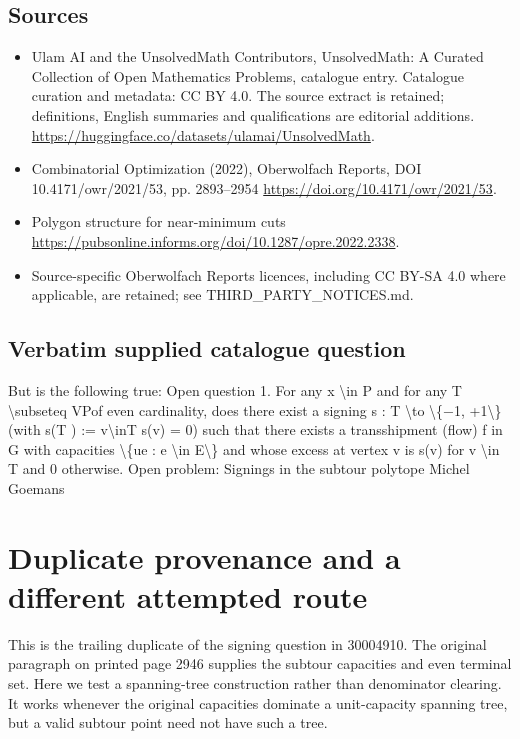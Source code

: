 \documentclass[11pt]{article}
\begin{document}
\subsection{Sources}
\begin{itemize}
\item[S1] Ulam AI and the UnsolvedMath Contributors, UnsolvedMath: A Curated Collection of Open Mathematics Problems, catalogue entry. Catalogue curation and metadata: CC BY 4.0. The source extract is retained; definitions, English summaries and qualifications are editorial additions.
\url{https://huggingface.co/datasets/ulamai/UnsolvedMath}.
\item[S2] Combinatorial Optimization (2022), Oberwolfach Reports, DOI 10.4171/owr/2021/53, pp. 2893--2954
\url{https://doi.org/10.4171/owr/2021/53}.
\item[S3] Polygon structure for near-minimum cuts
\url{https://pubsonline.informs.org/doi/10.1287/opre.2022.2338}.
\item Source-specific Oberwolfach Reports licences, including CC BY-SA 4.0 where applicable, are retained; see THIRD\_PARTY\_NOTICES.md.
\end{itemize}
\subsection{Verbatim supplied catalogue question}
But is the following true: Open question 1. For any x \textbackslash{}in P and for any T \textbackslash{}subseteq VPof even cardinality, does there exist a signing s : T \textbackslash{}to \textbackslash{}\{−1, +1\textbackslash{}\} (with s(T ) := v\textbackslash{}inT s(v) = 0) such that there exists a transshipment (flow) f in G with capacities \textbackslash{}\{ue : e \textbackslash{}in E\textbackslash{}\} and whose excess at vertex v is s(v) for v \textbackslash{}in T and 0 otherwise. Open problem: Signings in the subtour polytope Michel Goemans

\section{Duplicate provenance and a different attempted route}
This is the trailing duplicate of the signing question in 30004910.
The original paragraph on printed page 2946 supplies the subtour
capacities and even terminal set. Here we test a spanning-tree
construction rather than denominator clearing. It works whenever
the original capacities dominate a unit-capacity spanning tree,
but a valid subtour point need not have such a tree.
\end{document}
